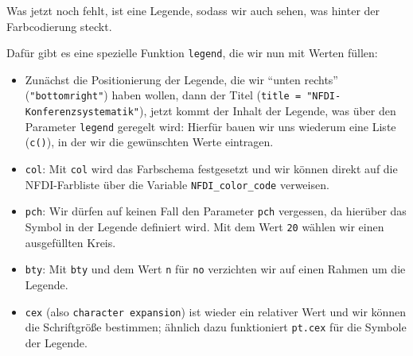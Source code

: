\documentclass[11pt]{article}
\providecommand{\tightlist}{%
      \setlength{\itemsep}{0pt}\setlength{\parskip}{0pt}}
\begin{document}
Was jetzt noch fehlt, ist eine Legende, sodass wir auch sehen, was
hinter der Farbcodierung steckt.

    Dafür gibt es eine spezielle Funktion \texttt{legend}, die wir nun mit
Werten füllen:

\begin{itemize}
\tightlist
\item
  Zunächst die Positionierung der Legende, die wir ``unten rechts''
  (\texttt{"bottomright"}) haben wollen, dann der Titel
  (\texttt{title\ =\ "NFDI-Konferenzsystematik"}), jetzt kommt der
  Inhalt der Legende, was über den Parameter \texttt{legend} geregelt
  wird: Hierfür bauen wir uns wiederum eine Liste (\texttt{c()}), in der
  wir die gewünschten Werte eintragen.
\item
  \texttt{col}: Mit \texttt{col} wird das Farbschema festgesetzt und wir
  können direkt auf die NFDI-Farbliste über die Variable
  \texttt{NFDI\_color\_code} verweisen.
\item
  \texttt{pch}: Wir dürfen auf keinen Fall den Parameter \texttt{pch}
  vergessen, da hierüber das Symbol in der Legende definiert wird. Mit
  dem Wert \texttt{20} wählen wir einen ausgefüllten Kreis.
\item
  \texttt{bty}: Mit \texttt{bty} und dem Wert \texttt{n} für \texttt{no}
  verzichten wir auf einen Rahmen um die Legende.
\item
  \texttt{cex} (also \texttt{character\ expansion}) ist wieder ein
  relativer Wert und wir können die Schriftgröße bestimmen; ähnlich dazu
  funktioniert \texttt{pt.cex} für die Symbole der Legende.
\end{itemize}
\end{document}
